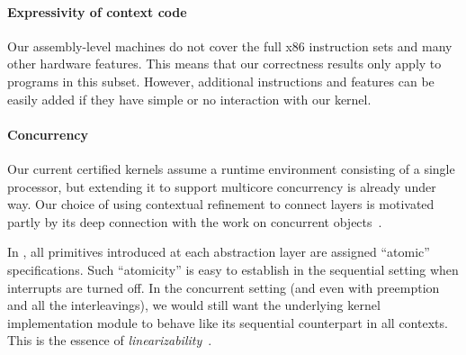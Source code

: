 
\paragraph{Expressivity of context code} 
Our assembly-level machines do not cover the full x86 instruction sets 
and many other hardware features. This means that our correctness results 
only apply to programs in this subset. However, additional instructions 
and features can be easily added if they have simple or no interaction
with our kernel. 

\paragraph{Concurrency}
Our current certified kernels assume a runtime environment consisting
of a single processor, but extending it to support multicore
concurrency is already under way. Our choice of using contextual refinement 
to connect layers is motivated partly by its
deep connection with the work on concurrent
objects~\cite{herlihy90,herlihy08book}.

In \CTOS, all primitives introduced at each abstraction layer are
assigned ``atomic'' specifications. Such ``atomicity'' is easy to
establish in the sequential setting when interrupts are turned off.
In the concurrent setting (and even with preemption and all the
interleavings), we would still want the underlying kernel
implementation module to behave like its sequential counterpart 
in all contexts. This is the essence of {\em linearizability}~\cite{herlihy90}.

